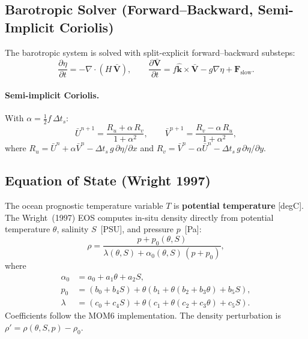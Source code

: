 \documentclass[11pt,a4paper]{article}
\newcommand{\pp}{\partial}
\newcommand{\half}{\tfrac{1}{2}}
\begin{document}
\subsection{Barotropic Solver (Forward--Backward, Semi-Implicit Coriolis)}

The barotropic system is solved with split-explicit forward--backward substeps:
\begin{equation}
  \frac{\pp\eta}{\pp t} = -\nabla\!\cdot\!(H\,\bar{\bm V}),
  \qquad
  \frac{\pp\bar{\bm V}}{\pp t} = f\hat{\bm k}\times\bar{\bm V} - g\nabla\eta + \bm F_{\mathrm{slow}}.
\end{equation}

\paragraph{Semi-implicit Coriolis.} With $\alpha=\half f\,\Delta t_s$:
\begin{equation}
  \bar U^{n+1} = \frac{R_u+\alpha\,R_v}{1+\alpha^2}, \qquad
  \bar V^{n+1} = \frac{R_v-\alpha\,R_u}{1+\alpha^2},
\end{equation}
where $R_u=\bar U^n+\alpha\bar V^n-\Delta t_s\,g\,\pp\eta/\pp x$ and $R_v=\bar V^n-\alpha\bar U^n-\Delta t_s\,g\,\pp\eta/\pp y$.

\subsection{Equation of State (Wright 1997)}

The ocean prognostic temperature variable $T$ is \textbf{potential temperature}
[degC].  The Wright~(1997) EOS computes in-situ density directly from
potential temperature $\theta$, salinity $S$~[PSU], and pressure $p$~[Pa]:
\begin{equation}
  \rho = \frac{p+p_0(\theta,S)}{\lambda(\theta,S)+\alpha_0(\theta,S)\,(p+p_0)},
\end{equation}
where
\begin{align}
  \alpha_0 &= a_0+a_1 \theta+a_2 S, \\
  p_0 &= (b_0+b_4 S)+\theta(b_1+\theta(b_2+b_3 \theta)+b_5 S), \\
  \lambda &= (c_0+c_4 S)+\theta(c_1+\theta(c_2+c_3 \theta)+c_5 S).
\end{align}
Coefficients follow the MOM6 implementation.  The density perturbation is $\rho'=\rho(\theta,S,p)-\rho_0$.
\end{document}
